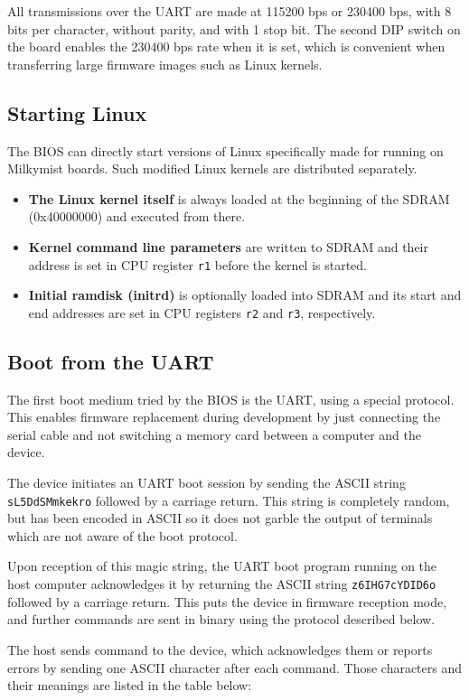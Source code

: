 \documentclass[a4paper,11pt]{article}
\begin{document}
All transmissions over the UART are made at 115200 bps or 230400 bps, with 8 bits per character, without parity, and with 1 stop bit. The second DIP switch on the board enables the 230400 bps rate when it is set, which is convenient when transferring large firmware images such as Linux kernels.

\subsection{Starting Linux}
The BIOS can directly start versions of Linux specifically made for running on Milkymist boards. Such modified Linux kernels are distributed separately.

\begin{itemize}
\item \textbf{The Linux kernel itself} is always loaded at the beginning of the SDRAM (0x40000000) and executed from there.
\item \textbf{Kernel command line parameters} are written to SDRAM and their address is set in CPU register \verb!r1! before the kernel is started.
\item \textbf{Initial ramdisk (initrd)} is optionally loaded into SDRAM and its start and end addresses are set in CPU registers \verb!r2! and \verb!r3!, respectively.
\end{itemize}

\subsection{Boot from the UART}
The first boot medium tried by the BIOS is the UART, using a special protocol. This enables firmware replacement during development by just connecting the serial cable and not switching a memory card between a computer and the device.

The device initiates an UART boot session by sending the ASCII string \verb!sL5DdSMmkekro! followed by a carriage return. This string is completely random, but has been encoded in ASCII so it does not garble the output of terminals which are not aware of the boot protocol.

Upon reception of this magic string, the UART boot program running on the host computer acknowledges it by returning the ASCII string \verb!z6IHG7cYDID6o! followed by a carriage return. This puts the device in firmware reception mode, and further commands are sent in binary using the protocol described below.

The host sends command to the device, which acknowledges them or reports errors by sending one ASCII character after each command. Those characters and their meanings are listed in the table below:\\
\end{document}
